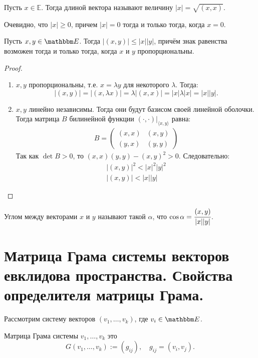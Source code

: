 \begin{Def}
	Пусть $x\in \mathbb{E}$. Тогда длиной вектора называют величину $|x| = \sqrt{(x,x)}$.
\end{Def}

Очевидно, что $|x| \geqslant 0$, причем $|x| = 0$ тогда и только тогда, когда $x = 0$.

\begin{Suggestion}
	Пусть $x, y \in \E$. Тогда $|(x,y)| \leqslant |x||y|$, причём знак равенства возможен тогда и только тогда, когда $x$ и $y$ пропорциональны.
\end{Suggestion}
\begin{proof}\
	\begin{enumerate}
		\item $x,y$ пропорциональны, т.е. $x = \lambda y$ для некоторого $\lambda$. Тогда:
		\[
			|(x,y)| = |(x,\lambda x)| = \lambda|(x,x)| = |x|\lambda|x| = |x||y|.
		\]
		\item $x,y$ линейно независимы. Тогда они будут базисом своей линейной оболочки. Тогда матрица $B$ билинейной функции $(\cdot, \cdot)\bigr|_{\langle x, y\rangle}$ равна:
		\begin{gather*}
		B = \begin{pmatrix}
			(x,x)& (x,y)\\
			(y,x)& (y,y)
		\end{pmatrix}
		\end{gather*}
	Так как $\det B > 0$, то $(x,x)(y,y) - (x,y)^2 > 0$. Следовательно:
	\begin{gather*}
			|(x,y)|^2 < |x|^2|y|^2\\
			|(x,y)| < |x||y|
	\end{gather*}
	\end{enumerate}
\end{proof}

\begin{Def}
	Углом между векторами $x$ и $y$ называют такой $\alpha$, что $ \cos \alpha = \cfrac{(x,y)}{|x||y|}$.
\end{Def}

\section{Матрица Грама системы векторов евклидова пространства. Свойства определителя матрицы Грама.}

Рассмотрим систему векторов $(v_1, \ldots, v_k)$, где $v_i \in \E$.
\begin{Def}
Матрица Грама системы $v_1, \ldots, v_k$ это
	$$G(v_1,\ldots, v_k) := (g_{ij}),\quad g_{ij} = (v_i,v_j).$$
\end{Def}

